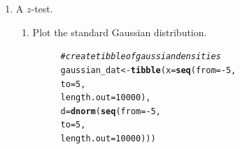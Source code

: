 \documentclass{article}\usepackage[]{graphicx}\usepackage[]{xcolor}
\makeatletter
\newcommand{\hlnum}[1]{\textcolor[rgb]{0.686,0.059,0.569}{#1}}%
\newcommand{\hlcom}[1]{\textcolor[rgb]{0.678,0.584,0.686}{\textit{#1}}}%
\newcommand{\hlopt}[1]{\textcolor[rgb]{0,0,0}{#1}}%
\newcommand{\hldef}[1]{\textcolor[rgb]{0.345,0.345,0.345}{#1}}%
\newcommand{\hlkwb}[1]{\textcolor[rgb]{0.69,0.353,0.396}{#1}}%
\newcommand{\hlkwc}[1]{\textcolor[rgb]{0.333,0.667,0.333}{#1}}%
\newcommand{\hlkwd}[1]{\textcolor[rgb]{0.737,0.353,0.396}{\textbf{#1}}}%
\newenvironment{kframe}{%
 \def\at@end@of@kframe{}%
 \ifinner\ifhmode%
  \def\at@end@of@kframe{\end{minipage}}%
  \begin{minipage}{\columnwidth}%
 \fi\fi%
 \def\FrameCommand##1{\hskip\@totalleftmargin \hskip-\fboxsep
 \colorbox{shadecolor}{##1}\hskip-\fboxsep
     \hskip-\linewidth \hskip-\@totalleftmargin \hskip\columnwidth}%
 \MakeFramed {\advance\hsize-\width
   \@totalleftmargin\z@ \linewidth\hsize
   \@setminipage}}%
 {\par\unskip\endMakeFramed%
 \at@end@of@kframe}
\newenvironment{knitrout}{}{} %
\makeatother
\begin{document}
\begin{enumerate}
\begin{enumerate}
\begin{enumerate}
      \item What is the largest observation in the rejection region?
      
\begin{knitrout}\scriptsize
{}\color{fgcolor}\begin{kframe}
\begin{alltt}
      \hlkwd{pbinom}\hldef{(}\hlkwc{q} \hldef{=} \hlnum{3}\hldef{,} \hlkwc{size} \hldef{= n,} \hlkwc{prob} \hldef{= p)} \hlcom{# Test out 3}
\end{alltt}
\begin{verbatim}
## [1] 0.01757813
\end{verbatim}
\begin{alltt}
      \hlcom{# 3 is the largest observation in the rejection region}
\end{alltt}
\end{kframe}
\end{knitrout}
      
      \item What is the achieved $\alpha$ for this test? That is, what 
      is the probability of a Type I error for this specification?
      
        \textcolor{red}{The achieved $\alpha$ is 0.018, because that is the associated probability with the largest observation in the rejection region}
      
    \end{enumerate}
    \item A $z$-test.
    \begin{enumerate}
      \item Plot the standard Gaussian distribution.
      
            \begin{figure}[H]
\begin{knitrout}\scriptsize
{}\color{fgcolor}\begin{kframe}
\begin{alltt}
\hlcom{# create tibble of gaussian densities}
\hldef{gaussian_dat} \hlkwb{<-} \hlkwd{tibble}\hldef{(}\hlkwc{x} \hldef{=} \hlkwd{seq}\hldef{(}\hlkwc{from} \hldef{=} \hlopt{-}\hlnum{5}\hldef{,}
                               \hlkwc{to} \hldef{=} \hlnum{5}\hldef{,}
                               \hlkwc{length.out} \hldef{=} \hlnum{10000}\hldef{),}
                       \hlkwc{d} \hldef{=} \hlkwd{dnorm}\hldef{(}\hlkwd{seq}\hldef{(}\hlkwc{from} \hldef{=} \hlopt{-}\hlnum{5}\hldef{,}
                                     \hlkwc{to} \hldef{=} \hlnum{5}\hldef{,}
                                     \hlkwc{length.out} \hldef{=} \hlnum{10000}\hldef{)))}


\end{alltt}
\end{kframe}
\end{knitrout}
\end{figure}
\end{enumerate}
\end{enumerate}
\end{enumerate}
\end{document}
